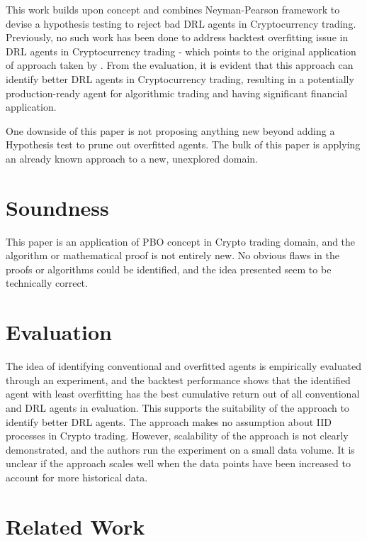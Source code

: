 \documentclass[twoside,11pt]{article}
\begin{document}
This work builds upon \cite{bailey2016probability} concept and combines Neyman-Pearson framework to devise a hypothesis testing to reject bad DRL agents in Cryptocurrency trading. Previously, no such work has been done to address backtest overfitting issue in DRL agents in Cryptocurrency trading - which points to the original application of approach taken by \cite{bailey2016probability}. From the evaluation, it is evident that this approach can identify better DRL agents in Cryptocurrency trading, resulting in a potentially production-ready agent for algorithmic trading and having significant financial application. 

One downside of this paper is not proposing anything new beyond adding a Hypothesis test to prune out overfitted agents. The bulk of this paper is applying an already known approach to a new, unexplored domain. 

\section{Soundness}

This paper is an application of PBO concept \cite{bailey2016probability} in Crypto trading domain, and the algorithm or mathematical proof is not entirely new.  No obvious flaws in the proofs or algorithms could be identified, and the idea presented seem to be technically correct.

\section{Evaluation}

The idea of identifying conventional and overfitted agents is empirically evaluated through an experiment, and the backtest performance shows that the identified agent with least overfitting has the best cumulative return out of all conventional and DRL agents in evaluation. This supports the suitability of the approach to identify better DRL agents. The approach makes no assumption about IID processes in Crypto trading. However, scalability of the approach is not clearly demonstrated, and the authors run the experiment on a small data volume. It is unclear if the approach scales well when the data points have been increased to account for more historical data. 

\section{Related Work}
\end{document}
